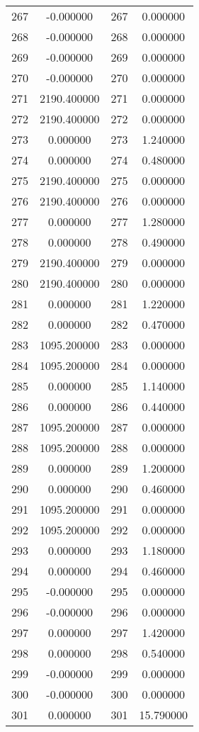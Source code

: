\documentclass[12pt]{article}
\begin{document}
\begin{longtable}{@{}cccc@{}}
267 & -0.000000 & 267 & 0.000000 \\
268 & -0.000000 & 268 & 0.000000 \\
269 & -0.000000 & 269 & 0.000000 \\
270 & -0.000000 & 270 & 0.000000 \\
271 & 2190.400000 & 271 & 0.000000 \\
272 & 2190.400000 & 272 & 0.000000 \\
273 & 0.000000 & 273 & 1.240000 \\
274 & 0.000000 & 274 & 0.480000 \\
275 & 2190.400000 & 275 & 0.000000 \\
276 & 2190.400000 & 276 & 0.000000 \\
277 & 0.000000 & 277 & 1.280000 \\
278 & 0.000000 & 278 & 0.490000 \\
279 & 2190.400000 & 279 & 0.000000 \\
280 & 2190.400000 & 280 & 0.000000 \\
281 & 0.000000 & 281 & 1.220000 \\
282 & 0.000000 & 282 & 0.470000 \\
283 & 1095.200000 & 283 & 0.000000 \\
284 & 1095.200000 & 284 & 0.000000 \\
285 & 0.000000 & 285 & 1.140000 \\
286 & 0.000000 & 286 & 0.440000 \\
287 & 1095.200000 & 287 & 0.000000 \\
288 & 1095.200000 & 288 & 0.000000 \\
289 & 0.000000 & 289 & 1.200000 \\
290 & 0.000000 & 290 & 0.460000 \\
291 & 1095.200000 & 291 & 0.000000 \\
292 & 1095.200000 & 292 & 0.000000 \\
293 & 0.000000 & 293 & 1.180000 \\
294 & 0.000000 & 294 & 0.460000 \\
295 & -0.000000 & 295 & 0.000000 \\
296 & -0.000000 & 296 & 0.000000 \\
297 & 0.000000 & 297 & 1.420000 \\
298 & 0.000000 & 298 & 0.540000 \\
299 & -0.000000 & 299 & 0.000000 \\
300 & -0.000000 & 300 & 0.000000 \\
301 & 0.000000 & 301 & 15.790000 \\

\end{longtable}
\end{document}
